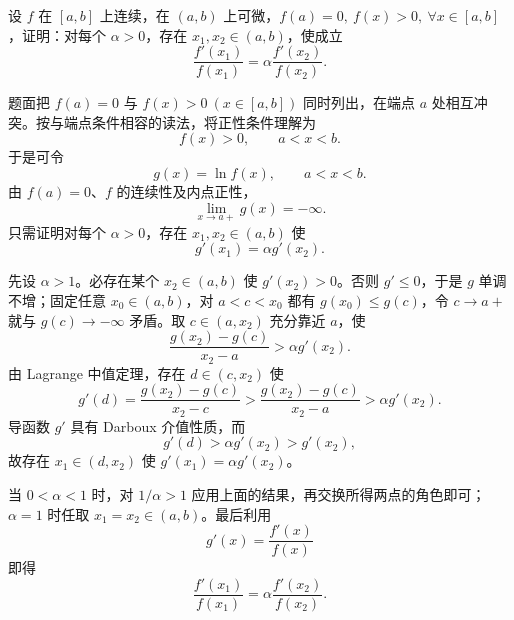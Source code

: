 \begin{xreferenceproblem}[7]
设 $f$ 在 $[a,b]$ 上连续，在 $(a,b)$ 上可微，$f(a)=0,\ f(x)>0,\ \forall x\in[a,b]$，证明：对每个 $\alpha>0$，存在 $x_1,x_2\in(a,b)$，使成立
\[
  \frac{f'(x_1)}{f(x_1)}=\alpha\frac{f'(x_2)}{f(x_2)}.
\]
\end{xreferenceproblem}
\begin{xsolution}
题面把 $f(a)=0$ 与 $f(x)>0\ (x\in[a,b])$ 同时列出，在端点 $a$ 处相互冲突。按与端点条件相容的读法，将正性条件理解为
\[
  f(x)>0,\qquad a<x<b.
\]
于是可令
\[
  g(x)=\ln f(x),\qquad a<x<b.
\]
由 $f(a)=0$、$f$ 的连续性及内点正性，
\[
  \lim_{x\to a+}g(x)=-\infty.
\]
只需证明对每个 $\alpha>0$，存在 $x_1,x_2\in(a,b)$ 使
\[
  g'(x_1)=\alpha g'(x_2).
\]

先设 $\alpha>1$。必存在某个 $x_2\in(a,b)$ 使 $g'(x_2)>0$。否则 $g'\leqslant0$，于是 $g$ 单调不增；固定任意 $x_0\in(a,b)$，对 $a<c<x_0$ 都有 $g(x_0)\leqslant g(c)$，令 $c\to a+$ 就与 $g(c)\to-\infty$ 矛盾。取 $c\in(a,x_2)$ 充分靠近 $a$，使
\[
  \frac{g(x_2)-g(c)}{x_2-a}>\alpha g'(x_2).
\]
由 Lagrange 中值定理，存在 $d\in(c,x_2)$ 使
\[
  g'(d)=\frac{g(x_2)-g(c)}{x_2-c}
  >\frac{g(x_2)-g(c)}{x_2-a}
  >\alpha g'(x_2).
\]
导函数 $g'$ 具有 Darboux 介值性质，而
\[
  g'(d)>\alpha g'(x_2)>g'(x_2),
\]
故存在 $x_1\in(d,x_2)$ 使 $g'(x_1)=\alpha g'(x_2)$。

当 $0<\alpha<1$ 时，对 $1/\alpha>1$ 应用上面的结果，再交换所得两点的角色即可；$\alpha=1$ 时任取 $x_1=x_2\in(a,b)$。最后利用
\[
  g'(x)=\frac{f'(x)}{f(x)}
\]
即得
\[
  \frac{f'(x_1)}{f(x_1)}
  =\alpha\frac{f'(x_2)}{f(x_2)}.
\]
\end{xsolution}



